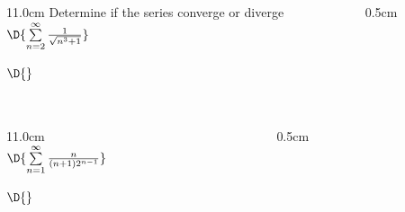 \begin{frame}
\frametitle{}
\scriptsize

\vspace{0.2cm}

\begin{columns}
\begin{column}{11.0cm}
Determine if the series converge or diverge\\

$\D{\sum \limits_{n=2}^{\infty} \frac{1}{\sqrt{n^3 + 1}}}$

\vspace{4.0cm}

$\D{}$

\vspace{6.5cm}

\end{column}
\begin{column}{0.5cm}
	
\end{column}
\end{columns}
\end{frame}

\begin{frame}
\frametitle{}
\scriptsize

\vspace{0.2cm}

\begin{columns}
\begin{column}{11.0cm}
\\

$\D{\sum \limits_{n=1}^{\infty} \frac{n}{(n + 1)2^{n-1}}}$

\vspace{4.0cm}

$\D{}$

\vspace{6.5cm}

\end{column}
\begin{column}{0.5cm}
	
\end{column}
\end{columns}
\end{frame}

